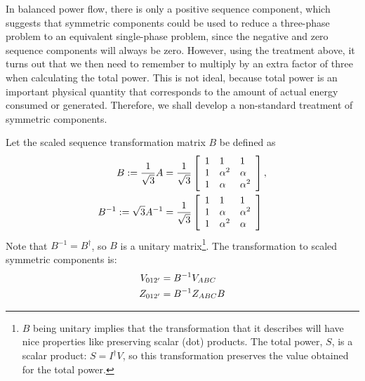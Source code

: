 \documentclass[11pt]{article}
\begin{document}
In balanced power flow, there is only a positive sequence component, which suggests that symmetric components could be used to reduce a three-phase problem to an equivalent single-phase problem, since the negative and zero sequence components will always be zero. However, using the treatment above, it turns out that we then need to remember to multiply by an extra factor of three when calculating the total power. This is not ideal, because total power is an important physical quantity that corresponds to the amount of actual energy consumed or generated. Therefore, we shall develop a non-standard treatment of symmetric components.

Let the scaled sequence transformation matrix $B$ be defined as
\begin{align}
	B := \frac{1}{\sqrt{3}}A &= \frac{1}{\sqrt{3}}\left[
		\begin{array}{lll}
			1 & 1 & 1 \\
			1 & \alpha^2 & \alpha \\
			1 & \alpha & \alpha^2
		\end{array}	\right], \notag \\
	B^{-1} := \sqrt{3} A^{-1} &=\frac{1}{\sqrt{3}}\left[
		\begin{array}{lll}
			1 & 1 & 1 \\
			1 & \alpha & \alpha^2 \\
			1 & \alpha^2 & \alpha
		\end{array} \right]
\end{align}
Note that $B^{-1} = B^\dag$, so $B$ is a unitary matrix\footnote{$B$ being unitary implies that the transformation that it describes will have nice properties like preserving scalar (dot) products. The total power, $S$, is a scalar product: $S = I^\dag V$, so this transformation preserves the value obtained for the total power.}. The transformation to scaled symmetric components is:
\begin{align}
	V_{012'} &= B^{-1}V_{ABC} \notag \\
	Z_{012'} &= B^{-1}Z_{ABC}B
\end{align}
\end{document}
